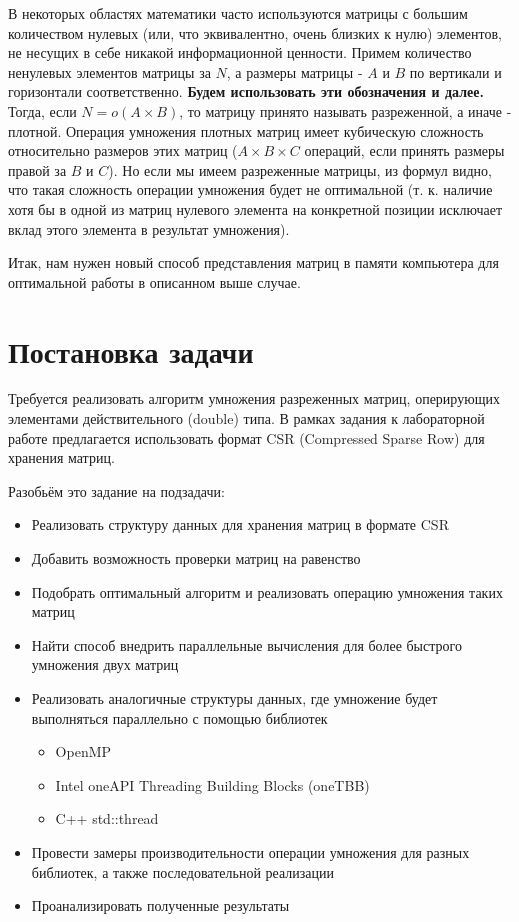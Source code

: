 \documentclass{report}
\begin{document}
В некоторых областях математики часто используются матрицы с большим количеством нулевых (или, что эквивалентно, очень близких к нулю) элементов, не несущих в себе никакой информационной ценности. Примем количество ненулевых элементов матрицы за $N$, а размеры матрицы - $A$ и $B$ по вертикали и горизонтали соответственно. \textbf{Будем использовать эти обозначения и далее.} Тогда, если $N = o(A\times B)$, то матрицу принято называть разреженной, а иначе - плотной. Операция умножения плотных матриц имеет кубическую сложность относительно размеров этих матриц ($A \times B \times C$ операций, если принять размеры правой за $B$ и $C$). Но если мы имеем разреженные матрицы, из формул видно, что такая сложность операции умножения будет не оптимальной (т. к. наличие хотя бы в одной из матриц нулевого элемента на конкретной позиции исключает вклад этого элемента в результат умножения).

Итак, нам нужен новый способ представления матриц в памяти компьютера для оптимальной работы в описанном выше случае.

\newpage
\section*{Постановка задачи}
Требуется реализовать алгоритм умножения разреженных матриц, оперирующих элементами действительного (double) типа. В рамках задания к лабораторной работе предлагается использовать формат CSR (Compressed Sparse Row) для хранения матриц.

Разобьём это задание на подзадачи:
\begin{itemize}
\item Реализовать структуру данных для хранения матриц в формате CSR
\item Добавить возможность проверки матриц на равенство
\item Подобрать оптимальный алгоритм и реализовать операцию умножения таких матриц
\item Найти способ внедрить параллельные вычисления для более быстрого умножения двух матриц
\item Реализовать аналогичные структуры данных, где умножение будет выполняться параллельно с помощью библиотек
\begin{itemize}
    \item OpenMP
    \item Intel\textsuperscript{\textregistered}  oneAPI Threading Building Blocks (oneTBB)
    \item C++ std::thread
\end{itemize}
\item Провести замеры производительности операции умножения для разных библиотек, а также последовательной реализации
\item Проанализировать полученные результаты
\end{itemize}
\end{document}
